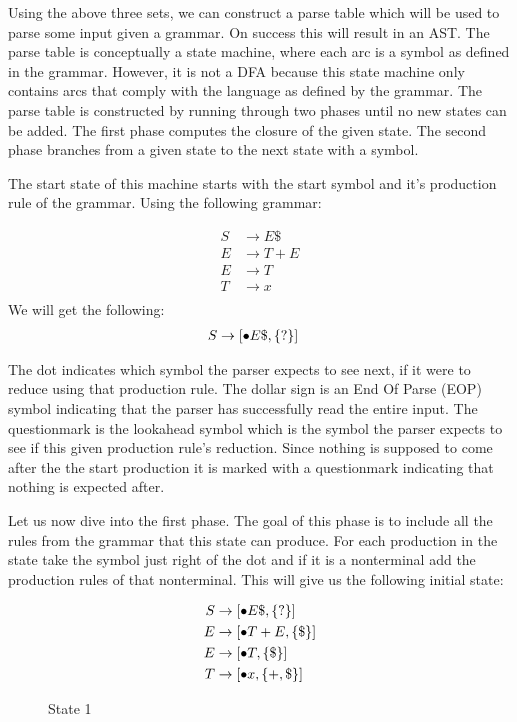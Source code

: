 Using the above three sets, we can construct a parse table which will be used to parse some input given a grammar. On success this will result in an AST. The parse table is conceptually a state machine, where each arc is a symbol as defined in the grammar. However, it is not a DFA because this state machine only contains arcs that comply with the language as defined by the grammar. The parse table is constructed by running through two phases until no new states can be added. The first phase computes the closure of the given state. The second phase branches from a given state to the next state with a symbol.

The start state of this machine starts with the start symbol and it's production rule of the grammar. Using the following grammar:

\begin{equation*}
  \begin{split}
      S &\rightarrow E\$\\
      E &\rightarrow T + E\\
      E &\rightarrow T\\
      T &\rightarrow x\\
  \end{split}
\end{equation*}
We will get the following:
\begin{equation*}
  \begin{split}
      S &\rightarrow [\bullet E\text{\$}, \left\{?\right\}] 
  \end{split}
\end{equation*}

The dot indicates which symbol the parser expects to see next, if it were to reduce using that production rule. The dollar sign is an End Of Parse (EOP) symbol indicating that the parser has successfully read the entire input. The questionmark is the lookahead symbol which is the symbol the parser expects to see if this given production rule's reduction. Since nothing is supposed to come after the the start production it is marked with a questionmark indicating that nothing is expected after. 

Let us now dive into the first phase. The goal of this phase is to include all the rules from the grammar that this state can produce. For each production in the state take the symbol just right of the dot and if it is a nonterminal add the production rules of that nonterminal. This will give us the following initial state:

\begin{figure}[htp!]
\begin{equation*}
  \begin{split}
      S &\rightarrow [\bullet E\$, \left\{?\right\}]\\
      E &\rightarrow [\bullet T+E, \left\{\$\right\}] \\
      E &\rightarrow [\bullet T, \left\{\$\right\}] \\
      T &\rightarrow [\bullet x, \left\{+,\$\right\}] \\
  \end{split}
\end{equation*}
\caption*{State 1}
\end{figure}


